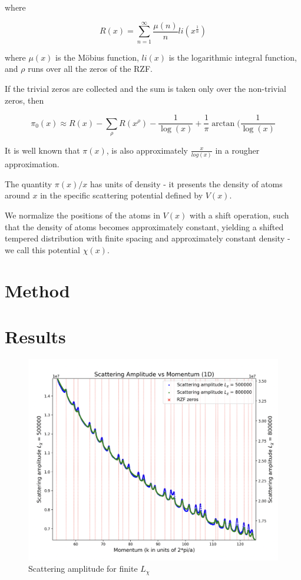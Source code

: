 \documentclass[11pt, oneside]{article}   	%
\begin{document}
where

\begin{equation}
R(x) = \sum_{n=1}^{\infty}\frac{\mu(n)}{n}li(x^{\frac{1}{n}})
\end{equation}

where $\mu(x)$ is the M\"obius function, $li(x)$ is the logarithmic integral function, and $\rho$ runs over all the zeros of the RZF.

If the trivial zeros are collected and the sum is taken only over the non-trivial zeros, then

\begin{equation}
\pi_0(x) \approx R(x) - \sum_{\rho}R(x^{\rho}) - \frac{1}{\log(x)} + \frac{1}{\pi}\arctan(\frac{1}{\log(x)}
\end{equation}
 
It is well known that $\pi(x)$, is also approximately $\frac{x}{log(x)}$ in a rougher approximation.

The quantity $\pi(x)/x$ has units of density - it presents the density of atoms around $x$ in the specific scattering potential defined by $V(x)$.

We normalize the positions of the atoms in $V(x)$ with a shift operation, such that the density of atoms becomes approximately constant, yielding a shifted tempered distribution with finite spacing and approximately constant density - we call this potential $\chi(x)$.






\section{Method}
\section{Results}

\begin{figure}[htbp]
\begin{center}
    \includegraphics[width=0.8\linewidth]{../images/zoomed_scattering.png}
   
\caption{Scattering amplitude for finite $L_{\chi}$}
\label{default}
\end{center}
\end{figure}
\end{document}
